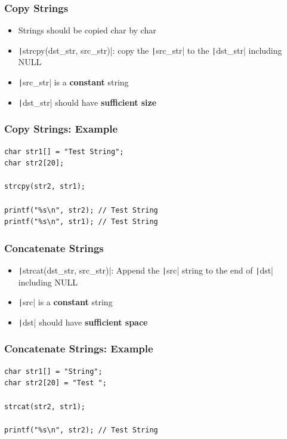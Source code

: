 \documentclass{../c-lecture}
\begin{document}
\begin{frame}
  \frametitle{Copy Strings}
  \begin{itemize}
    \item Strings should be copied char by char
    \item
      \texttt|strcpy(dst_str, src_str)|: copy the
      \texttt|src_str| to the
      \texttt|dst_str| including NULL

    \item
      \texttt|src_str| is a
      \textbf{\color{YellowOrange} constant} string

    \item
      \texttt|dst_str| should have
      \textbf{\color{YellowOrange} sufficient size}
  \end{itemize}
\end{frame}

\begin{frame}[fragile]
  \frametitle{Copy Strings: Example}
  \begin{verbatim}
char str1[] = "Test String";
char str2[20];

strcpy(str2, str1);

printf("%s\n", str2); // Test String
printf("%s\n", str1); // Test String
  \end{verbatim}
\end{frame}

\begin{frame}
  \frametitle{Concatenate Strings}
  \begin{itemize}
    \item
      \texttt|strcat(dst_str, src_str)|: Append the
      \texttt|src| string to the end of
      \texttt|dst| including NULL
    \item
      \texttt|src| is a
      \textbf{\color{YellowOrange} constant} string
    \item
      \texttt|dst| should have
      \textbf{\color{YellowOrange} sufficient space}
  \end{itemize}
\end{frame}

\begin{frame}[fragile]
  \frametitle{Concatenate Strings: Example}
  \begin{verbatim}
char str1[] = "String";
char str2[20] = "Test ";

strcat(str2, str1);

printf("%s\n", str2); // Test String
  \end{verbatim}
\end{frame}
\end{document}
